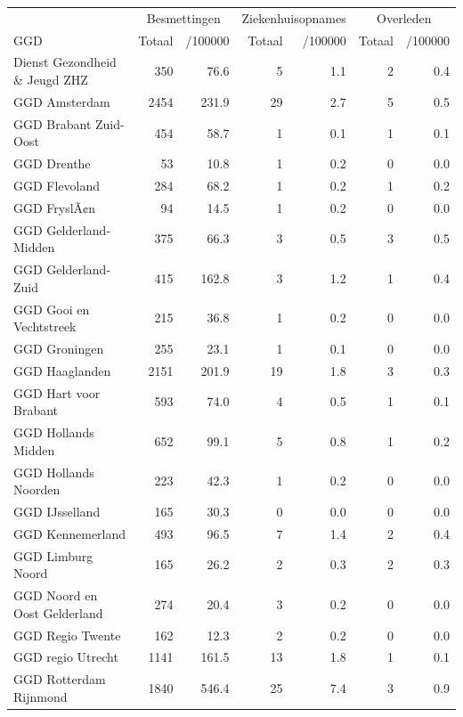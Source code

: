 \documentclass[
  english,
  man,floatsintext]{apa6}
\begin{document}
\begin{table}[H]
\centering\begingroup\fontsize{10}{12}\selectfont

\begin{threeparttable}
\begin{tabular}{lrrrrrr}
\toprule
\multicolumn{1}{c}{ } & \multicolumn{2}{c}{Besmettingen} & \multicolumn{2}{c}{Ziekenhuisopnames} & \multicolumn{2}{c}{Overleden} \\
\cmidrule(l{3pt}r{3pt}){2-3} \cmidrule(l{3pt}r{3pt}){4-5} \cmidrule(l{3pt}r{3pt}){6-7}
GGD & Totaal & /100000 & Totaal & /100000 & Totaal & /100000\\
\midrule
Dienst Gezondheid \& Jeugd ZHZ & 350 & 76.6 & 5 & 1.1 & 2 & 0.4\\
GGD Amsterdam & 2454 & 231.9 & 29 & 2.7 & 5 & 0.5\\
GGD Brabant Zuid-Oost & 454 & 58.7 & 1 & 0.1 & 1 & 0.1\\
GGD Drenthe & 53 & 10.8 & 1 & 0.2 & 0 & 0.0\\
GGD Flevoland & 284 & 68.2 & 1 & 0.2 & 1 & 0.2\\
GGD FryslÃ¢n & 94 & 14.5 & 1 & 0.2 & 0 & 0.0\\
GGD Gelderland-Midden & 375 & 66.3 & 3 & 0.5 & 3 & 0.5\\
GGD Gelderland-Zuid & 415 & 162.8 & 3 & 1.2 & 1 & 0.4\\
GGD Gooi en Vechtstreek & 215 & 36.8 & 1 & 0.2 & 0 & 0.0\\
GGD Groningen & 255 & 23.1 & 1 & 0.1 & 0 & 0.0\\
GGD Haaglanden & 2151 & 201.9 & 19 & 1.8 & 3 & 0.3\\
GGD Hart voor Brabant & 593 & 74.0 & 4 & 0.5 & 1 & 0.1\\
GGD Hollands Midden & 652 & 99.1 & 5 & 0.8 & 1 & 0.2\\
GGD Hollands Noorden & 223 & 42.3 & 1 & 0.2 & 0 & 0.0\\
GGD IJsselland & 165 & 30.3 & 0 & 0.0 & 0 & 0.0\\
GGD Kennemerland & 493 & 96.5 & 7 & 1.4 & 2 & 0.4\\
GGD Limburg Noord & 165 & 26.2 & 2 & 0.3 & 2 & 0.3\\
GGD Noord en Oost Gelderland & 274 & 20.4 & 3 & 0.2 & 0 & 0.0\\
GGD Regio Twente & 162 & 12.3 & 2 & 0.2 & 0 & 0.0\\
GGD regio Utrecht & 1141 & 161.5 & 13 & 1.8 & 1 & 0.1\\
GGD Rotterdam Rijnmond & 1840 & 546.4 & 25 & 7.4 & 3 & 0.9\\

\end{tabular}
\end{threeparttable}
\end{table}
\end{document}
